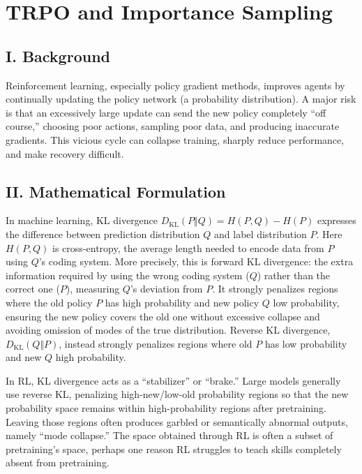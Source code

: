 \setcounter{section}{1}

\hypertarget{trpo-and-importance-sampling}{%
\section{TRPO and Importance Sampling}\label{trpo-and-importance-sampling}}

\hypertarget{i.-background}{%
\subsection{I. Background}\label{i.-background}}

Reinforcement learning, especially policy gradient methods, improves agents by continually updating the policy network (a probability distribution). A major risk is that an excessively large update can send the new policy completely ``off course,'' choosing poor actions, sampling poor data, and producing inaccurate gradients. This vicious cycle can collapse training, sharply reduce performance, and make recovery difficult.

\hypertarget{ii.-mathematical-formulation}{%
\subsection{II. Mathematical Formulation}\label{ii.-mathematical-formulation}}

In machine learning, KL divergence \(D_{\mathrm{KL}}(P\Vert Q)=H(P,Q)-H(P)\) expresses the difference between prediction distribution \(Q\) and label distribution \(P\). Here \(H(P,Q)\) is cross-entropy, the average length needed to encode data from \(P\) using \(Q\)'s coding system. More precisely, this is forward KL divergence: the extra information required by using the wrong coding system (\(Q\)) rather than the correct one (\(P\)), measuring \(Q\)'s deviation from \(P\). It strongly penalizes regions where the old policy \(P\) has high probability and new policy \(Q\) low probability, ensuring the new policy covers the old one without excessive collapse and avoiding omission of modes of the true distribution. Reverse KL divergence, \(D_{\mathrm{KL}}(Q\Vert P)\), instead strongly penalizes regions where old \(P\) has low probability and new \(Q\) high probability.

In RL, KL divergence acts as a ``stabilizer'' or ``brake.'' Large models generally use reverse KL, penalizing high-new/low-old probability regions so that the new probability space remains within high-probability regions after pretraining. Leaving those regions often produces garbled or semantically abnormal outputs, namely ``mode collapse.'' The space obtained through RL is often a subset of pretraining's space, perhaps one reason RL struggles to teach skills completely absent from pretraining.

